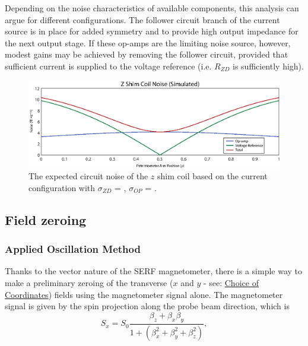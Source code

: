 \documentclass[PaulGanssle-Thesis.tex]{subfiles}
\begin{document}
Depending on the noise characteristics of available components, this analysis can argue for different configurations. The follower circuit branch of the current source is in place for added symmetry and to provide high output impedance for the next output stage. If these op-amps are the limiting noise source, however, modest gains may be achieved by removing the follower circuit, provided that sufficient current is supplied to the voltage reference (i.e. $R_{ZD}$ is sufficiently high).

\begin{figure}[ht!]
\includegraphics[width=0.95\tw]{figures/magnetometer/ShimCoilNoise.eps}
\caption{The expected circuit noise of the $z$ shim coil based on the current configuration with $\sigma_{ZD}$ = , $\sigma_{OP}$ = .}
\label{fig:ZFieldCoilNoise}
\end{figure}

\subsection{Field zeroing}
\label{mag.design.shim.coils.zeroing}
\subsubsection{Applied Oscillation Method}
\label{mag.design.shim.coils.zeroing.oscillation}
Thanks to the vector nature of the SERF magnetometer, there is a simple way to make a preliminary zeroing of the transverse ($x$ and $y$ - see: \hyperref[terminology.coordinates]{Choice of Coordinates}) fields using the magnetometer signal alone. The magnetometer signal is given by the spin projection along the probe beam direction\cite{Seltzer2004}, which is
\begin{equation}
\label{oscillation.serf.spinprojection}
S_x = S_0\frac{\beta_z + \beta_x\beta_y}{1 + \left(\beta_x^2 + \beta_y^2 + \beta_z^2\right)},
\end{equation}
\end{document}
